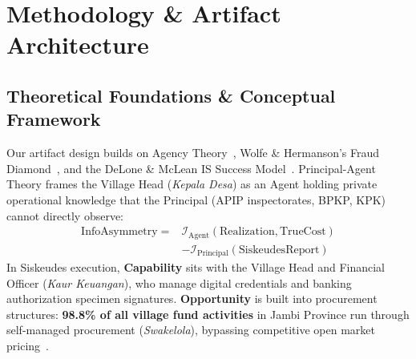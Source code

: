 \documentclass[conference]{IEEEtran}
\begin{document}
\section{Methodology \& Artifact Architecture}

\subsection{Theoretical Foundations \& Conceptual Framework}

Our artifact design builds on Agency Theory~\cite{ref25}, Wolfe \& Hermanson's Fraud Diamond~\cite{ref17b}, and the DeLone \& McLean IS Success Model~\cite{ref10}. Principal-Agent Theory frames the Village Head (\textit{Kepala Desa}) as an Agent holding private operational knowledge that the Principal (APIP inspectorates, BPKP, KPK) cannot directly observe:
\begin{equation}
\begin{aligned}
\mathrm{InfoAsymmetry} = {} & \mathcal{I}_{\mathrm{Agent}}(\mathrm{Realization}, \mathrm{TrueCost}) \\
& - \mathcal{I}_{\mathrm{Principal}}(\mathrm{SiskeudesReport})
\end{aligned}
\end{equation}
In Siskeudes execution, \textbf{Capability} sits with the Village Head and Financial Officer (\textit{Kaur Keuangan}), who manage digital credentials and banking authorization specimen signatures. \textbf{Opportunity} is built into procurement structures: \textbf{98.8\% of all village fund activities} in Jambi Province run through self-managed procurement (\textit{Swakelola}), bypassing competitive open market pricing~\cite{ref9}.
\end{document}
